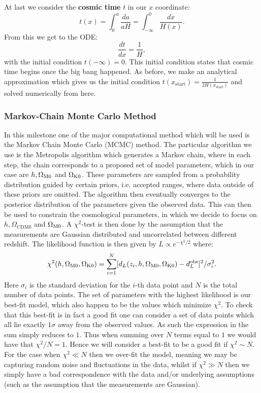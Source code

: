 \documentclass[%
reprint,
 amsmath,amssymb,
 aps,
]{revtex4-2}
\begin{document}
At last we consider the \textbf{cosmic time} $t$ in our $x$ coordinate:
\[t(x)=\int_0^a\frac{da}{aH}=\int_{-\infty}^0\frac{dx}{H(x)}.\]
From this we get to the ODE:
\begin{equation}
	\frac{dt}{dx}=\frac{1}{H}, \label{eq:dtdx}
\end{equation}
with the initial condition $t(-\infty)=0$. This initial condition states that cosmic time begins once the big bang happened. As before, we make an analytical approximation which gives us the initial condition $t(x_\text{start})=\frac{1}{2H(x_\text{start})}$ and solved numerically from here.

\subsubsection{Markov-Chain Monte Carlo Method}
In this milestone one of the major computational method which will be used is the Markov Chain Monte Carlo (MCMC) method. The particular algorithm we use is the Metropolis algorithm which generates a Markov chain, where in each step, the chain corresponds to a proposed set of model parameters, which in our case are $h, \Omega_{\text M0}$ and $\Omega_{\text K0}$. These parameters are sampled from a probability distribution guided by certain priors, i.e. accepted ranges, where data outside of these priors are omitted. The algorithm then eventually converges to the posterior distribution of the parameters given the observed data. This can then be used to constrain the cosmological parameters, in which we decide to focus on $h, \Omega_{\text{CDM}0}$ and $\Omega_{\text M0}$. A $\chi^2$-test is then done by the assumption that the measurements are Gaussian distributed and uncorrelated between different redshift. The likelihood function is then given by $L\propto e^{-\chi^2/2}$ where:
\[\chi^2(h,\Omega_{\text M0},\Omega_{\text K0})=\sum_{i=1}^N[d_L(z_i,h,\Omega_{\text M0},\Omega_{\text K0})-d_L^\text{obs}]^2/\sigma_i^2.\]
Here $\sigma_i$ is the standard deviation for the $i$-th data point and $N$ is the total number of data points. The set of parameters with the highest likelihood is our best-fit model, which also happen to be the values which minimize $\chi^2$. To check that this best-fit is in fact a good fit one can consider a set of data points which all lie exactly $1\sigma$ away from the observed values. As such the expression in the sum simply reduces to $1$. Thus when summing over $N$ terms equal to $1$ we would have that $\chi^2/N=1$. Hence we will consider a best-fit to be a good fit if $\chi^2\sim N$. For the case when $\chi^2\ll N$ then we over-fit the model, meaning we may be capturing random noise and fluctuations in the data, whilst if $\chi^2\gg N$ then we simply have a bad correspondence with the data and/or underlying assumptions (such as the assumption that the measurements are Gaussian).
\end{document}

